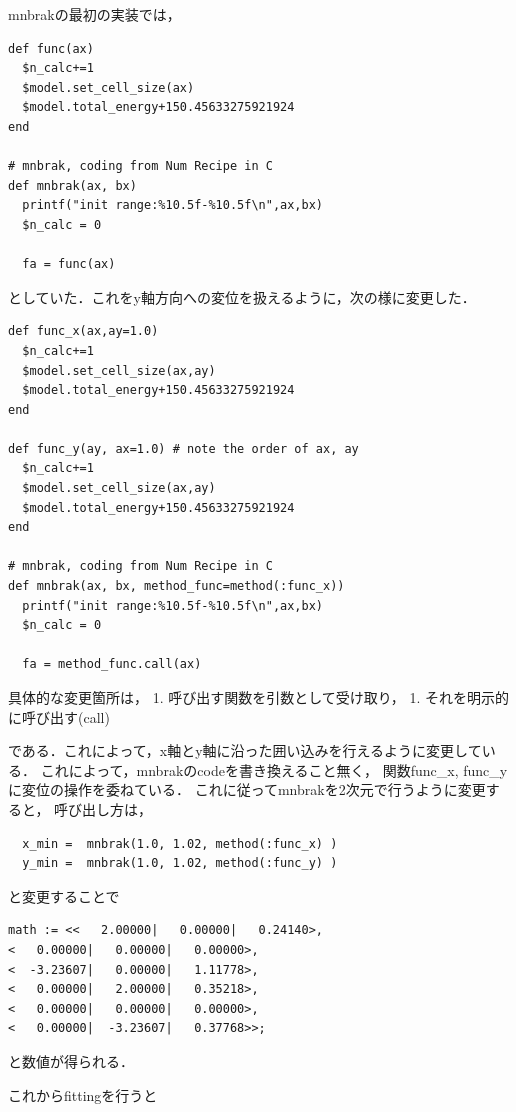 \documentclass[11pt,dvipdfmx]{jsarticle}
\begin{document}
mnbrakの最初の実装では，

\begin{verbatim}
def func(ax)
  $n_calc+=1
  $model.set_cell_size(ax)
  $model.total_energy+150.45633275921924
end

# mnbrak, coding from Num Recipe in C
def mnbrak(ax, bx)
  printf("init range:%10.5f-%10.5f\n",ax,bx)
  $n_calc = 0

  fa = func(ax)
\end{verbatim}

としていた．これをy軸方向への変位を扱えるように，次の様に変更した．

\begin{verbatim}
def func_x(ax,ay=1.0)
  $n_calc+=1
  $model.set_cell_size(ax,ay)
  $model.total_energy+150.45633275921924
end

def func_y(ay, ax=1.0) # note the order of ax, ay 
  $n_calc+=1
  $model.set_cell_size(ax,ay)
  $model.total_energy+150.45633275921924
end

# mnbrak, coding from Num Recipe in C
def mnbrak(ax, bx, method_func=method(:func_x))
  printf("init range:%10.5f-%10.5f\n",ax,bx)
  $n_calc = 0

  fa = method_func.call(ax)
\end{verbatim}

具体的な変更箇所は， 1. 呼び出す関数を引数として受け取り， 1.
それを明示的に呼び出す(call)

である．これによって，x軸とy軸に沿った囲い込みを行えるように変更している．
これによって，mnbrakのcodeを書き換えること無く， 関数func\_x,
func\_yに変位の操作を委ねている．
これに従ってmnbrakを2次元で行うように変更すると， 呼び出し方は，

\begin{verbatim}
  x_min =  mnbrak(1.0, 1.02, method(:func_x) )
  y_min =  mnbrak(1.0, 1.02, method(:func_y) )
\end{verbatim}

と変更することで

\begin{verbatim}
math := <<   2.00000|   0.00000|   0.24140>,
<   0.00000|   0.00000|   0.00000>,
<  -3.23607|   0.00000|   1.11778>,
<   0.00000|   2.00000|   0.35218>,
<   0.00000|   0.00000|   0.00000>,
<   0.00000|  -3.23607|   0.37768>>;
\end{verbatim}

と数値が得られる．

これからfittingを行うと
\end{document}
